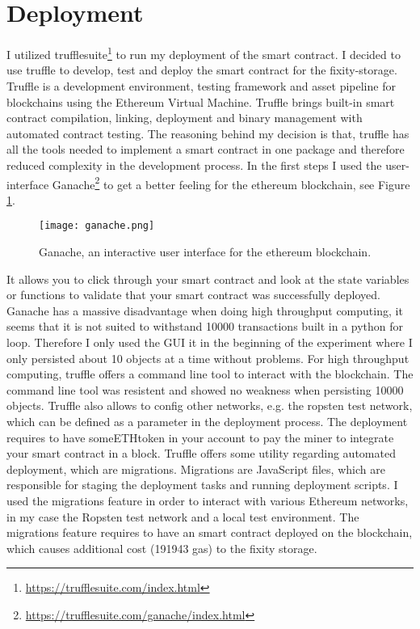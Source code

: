 \section{Deployment}
I utilized trufflesuite\footnote{\url{https://trufflesuite.com/index.html}} to run my deployment of the smart contract. I decided to use truffle to develop, test and deploy the smart contract for the fixity-storage. Truffle is a development environment, testing framework and asset pipeline for blockchains using the Ethereum Virtual Machine. Truffle brings built-in smart contract compilation, linking, deployment and binary management with automated contract testing. The reasoning behind my decision is that, truffle has all the tools needed to implement a smart contract in one package and therefore reduced complexity in the development process. In the first steps I used the user-interface Ganache\footnote{\url{https://trufflesuite.com/ganache/index.html}} to get a better feeling for the ethereum blockchain, see Figure \ref{fig:ganache}.
\begin{figure}[h]
  \caption{Ganache, an interactive user interface for the ethereum blockchain.}
  \label{fig:ganache}
    \centering
    \texttt{[image: ganache.png]}
\end{figure}
It allows you to click through your smart contract and look at the state variables or functions to validate that your smart contract was successfully deployed. Ganache has a massive disadvantage when doing high throughput computing, it seems that it is not suited to withstand 10000 transactions built in a python for loop. Therefore I only used the GUI it in the beginning of the experiment where I only persisted about 10 objects at a time without problems. For high throughput computing, truffle offers a command line tool to interact with the blockchain. The command line tool was resistent and showed no weakness when persisting 10000 objects.
Truffle also allows to config other networks, e.g. the ropsten test network, which can be defined as a parameter in the deployment process. The deployment requires to have someETHtoken in your account to pay the miner to integrate your smart contract in a block. 
Truffle offers some utility regarding automated deployment, which are migrations. Migrations are JavaScript files, which are responsible for staging the deployment tasks and running deployment scripts. I used the migrations feature in order to interact with various Ethereum networks, in my case the Ropsten test network and a local test environment. The migrations feature requires to have an smart contract deployed on the blockchain, which causes additional cost (191943 gas) to the fixity storage. 
